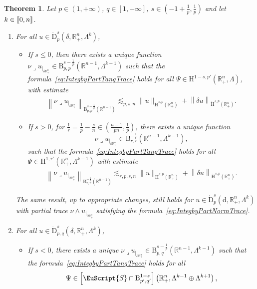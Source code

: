 \documentclass[10pt]{amsart}
\newtheorem{theo}{Theorem}[section]
\theoremstyle{definition}\newtheorem{defi}[theo]{Definition}\newtheorem{rema}[theo]{Remark}\newtheorem{exam}[theo]{Example}\newtheorem{exem}[theo]{Example}\newtheorem{nota}[theo]{Notation}
\newcommand{\bbR}{\mathbb{R}}
\newcommand{\rmH}{\mathrm{H}}%
\newcommand{\rmB}{\mathrm{B}}
\newcommand{\rmd}{\mathrm{d}}
\newcommand{\rmD}{\mathrm{D}}
\newcommand{\eus}{\EuScript}
\newcommand{\llbracket}{\mathopen{[\mkern -2.7mu[}}
\newcommand{\rrbracket}{\mathclose{]\mkern -2.7mu]}}
\newcommand{\llb}{\llbracket}
\newcommand{\rrb}{\rrbracket}
\newcommand{\iprod}{\mathbin{\lrcorner}}
\newcommand*{\romanenumi}{\renewcommand*{\theenumi}{\roman{enumi}}}
\begin{document}
\begin{theo}\label{thm:TracesDifferentialformsHomSpaces}
Let $p\in(1,+\infty)$, $q\in[1,+\infty]$, $s\in(-1+\frac{1}{p},\frac{1}{p})$ and let $k\in\llb 0,n\rrb$.
\begin{enumerate}\romanenumi
\item\label{theoA.2.1} For all $u\in{\dot{\rmD}}^{s}_{p}(\delta,\bbR^{n}_+,\Lambda^k)$,
\begin{itemize}
\item If $s\leqslant 0$, then there exists a unique function $\nu\iprod u_{|_{\partial\bbR^n_+}}\in \rmB^{s-\frac{1}{p}}_{p,p}(\bbR^{n-1},\Lambda^{k-1})$ such that the formula~\eqref{eq:IntegbyPartTangTrace} holds for all $\Psi\in \rmH^{1-s,p'}(\bbR^n_+, \Lambda)$, with estimate
\begin{align*}
\left\|\nu\iprod u_{|_{\partial\bbR^n_+}} \right\|_{\rmB^{s-\frac{1}{p}}_{p,p}\left(\bbR^{n-1}\right)}\lesssim_{p,s,n} \| u \|_{{\dot{\rmH}}^{s,p}\left(\bbR^n_+\right)} +
\left\| \delta u \right\|_{{\dot{\rmH}}^{s,p}\left(\bbR^n_+\right)} .
\end{align*}
\item If $s> 0$, for $\frac{1}{r}=\frac{1}{p}-\frac{s}{n}\in(\frac{n-1}{pn},\frac{1}{p})$, there exists a unique function
\[
\nu\iprod u_{|_{\partial\bbR^n_+}}\in \rmB^{-\frac{1}{r}}_{r,r}\left(\bbR^{n-1},\Lambda^{k-1}\right),
\]
such that the formula~\eqref{eq:IntegbyPartTangTrace} holds for all $\Psi\in \rmH^{1,r'}(\bbR^n_+, \Lambda^{k-1})$ with estimate
\begin{align*}
\left\|\nu\iprod u_{|_{\partial\bbR^n_+}}\right\|_{\rmB^{-\frac{1}{r}}_{r,r}\left(\bbR^{n-1}\right)}\lesssim_{r,p,s,n} \| u \|_{{\dot{\rmH}}^{s,p}\left(\bbR^n_+\right)} +
\left\| \delta u\right\|_{{\dot{\rmH}}^{s,p}\left(\bbR^n_+\right)} .
\end{align*}
\end{itemize}
The same result, up to appropriate changes, still holds for $u\in {\dot{\rmD}}^{s}_{p}(\rmd,\bbR^{n}_+,\Lambda^k)$ with partial trace $\nu\wedge u_{|_{\partial\bbR^n_+}}$ satisfying the formula~\eqref{eq:IntegbyPartNormTrace}.
\item\label{theoA.2.2}  For all $u\in {\dot{\rmD}}^{s}_{p,q}(\delta,\bbR^{n}_+,\Lambda^k)$,
\begin{itemize}
\item If $s < 0$, there exists a unique $\nu\iprod u_{|_{\partial\bbR^n_+}}\in \rmB^{s-\frac{1}{p}}_{p,q}(\bbR^{n-1},\Lambda^{k-1})$ such that the formula~\eqref{eq:IntegbyPartTangTrace} holds for all
\[
\Psi\in \left[\eus{S}\cap\rmB^{1-s}_{p',q'}\right]\left(\bbR^n_+, \Lambda^{k-1}\oplus\Lambda^{k+1}\right),
\]
\end{itemize}
\end{enumerate}
\end{theo}
\end{document}
